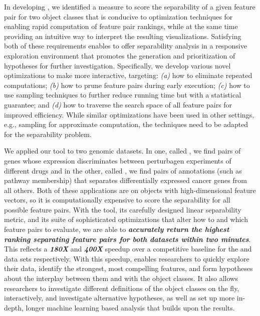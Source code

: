 In developing \genviz,
we identified a measure to score the separability
of a given feature pair for two object classes
that is conducive to
optimization techniques for enabling rapid
computation of feature pair rankings, while at
the same time providing an intuitive way to interpret
the resulting visualizations.
Satisfying both of these requirements enables \genviz to offer separability analysis in a responsive exploration environment that promotes the generation and prioritization of hypotheses for further investigation. Specifically, we develop various novel optimizations to make \genviz more interactive, targeting: {\em (a)} how to eliminate repeated computations; {\em (b)} how to prune feature pairs during early execution; {\em (c)} how to use sampling techniques to further reduce running time but with a statistical guarantee; and {\em (d)} how to traverse the search space of all feature pairs for improved efficiency.
While similar optimizations have been used in other settings,
e.g., sampling for approximate computation\needcite{},
the techniques need to be adapted for the separability problem.

We applied our \genviz tool to two genomic datasets.
In one, called \lincs, we find pairs of genes
whose expression discriminates between perturbagen experiments
of different drugs and in the other, called \msig,
we find pairs of annotations (such as pathway membership)
that separates differentially expressed cancer genes from all others.
Both of these applications are on objects with high-dimensional feature vectors,
so it is computationally expensive to score the separability
for all possible feature pairs.
With the \genviz tool, its carefully designed linear separability metric,
and its suite of sophisticated optimizations that alter how to and which feature pairs to evaluate,
we are able to {\bf \em accurately return the highest ranking separating
feature pairs for both datasets  within two minutes}.
This reflects a {\bf \em 180X} and {\bf \em 400X} speedup
over a competitive baseline for the \msig and \lincs data sets respectively.
With this speedup, \genviz enables researchers to quickly explore their data,
identify the strongest, most compelling features,
and form hypotheses about the interplay between them and with the object classes.
It also allows researchers to investigate different definitions
of the object classes on the fly, interactively,
and investigate alternative hypotheses,
as well as set up more in-depth,
longer machine learning based analysis that builds upon the \genviz results.

